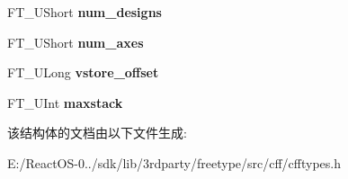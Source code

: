 \begin{DoxyCompactItemize}
F\+T\+\_\+\+U\+Short {\bfseries num\+\_\+designs}
\item 
\mbox{\label{struct_c_f_f___font_rec_dict_rec___abff6dd674f1bbf638f6ed7ed3322d4a2}} 
F\+T\+\_\+\+U\+Short {\bfseries num\+\_\+axes}
\item 
\mbox{\label{struct_c_f_f___font_rec_dict_rec___ade849d2f8b3a626549c0bb70d64a29fd}} 
F\+T\+\_\+\+U\+Long {\bfseries vstore\+\_\+offset}
\item 
\mbox{\label{struct_c_f_f___font_rec_dict_rec___ad12207e62922985d12b1dbe6ec1a4c47}} 
F\+T\+\_\+\+U\+Int {\bfseries maxstack}
\end{DoxyCompactItemize}


该结构体的文档由以下文件生成\+:\begin{DoxyCompactItemize}
\item 
E\+:/\+React\+O\+S-\/0../sdk/lib/3rdparty/freetype/src/cff/cfftypes.\+h\end{DoxyCompactItemize}
